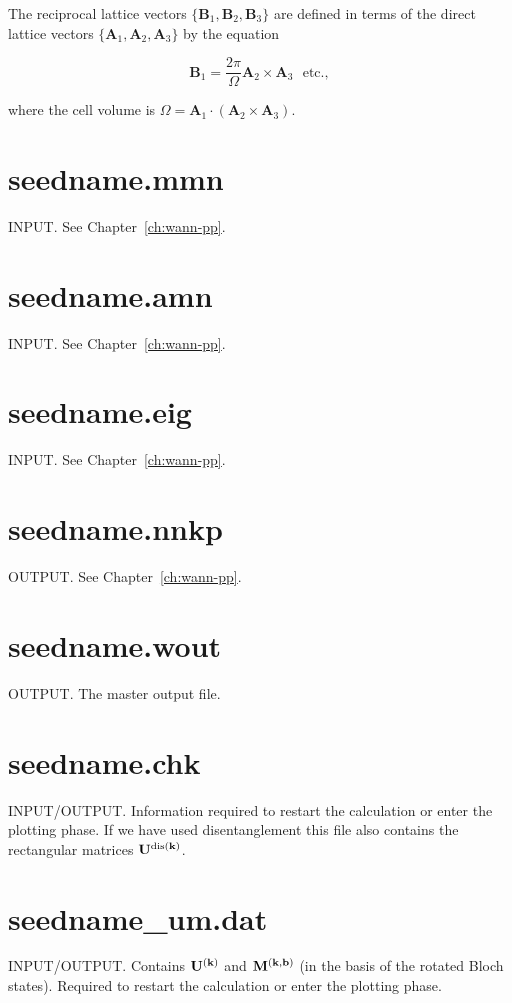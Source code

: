 The reciprocal lattice vectors
$\{\mathbf{B}_{1},\mathbf{B}_{2},\mathbf{B}_{3}\}$ are defined in
terms
of the direct lattice vectors
$\{\mathbf{A}_{1},\mathbf{A}_{2},\mathbf{A}_{3}\}$ by the equation

\begin{equation}
\mathbf{B}_{1} = \frac{2\pi}{\Omega}\mathbf{A}_{2}\times\mathbf{A}_{3}
\ \ \ \mathrm{etc.},
\end{equation}

where the cell volume is
$\Omega=\mathbf{A}_{1}\cdot(\mathbf{A}_{2}\times\mathbf{A}_{3})$.

\section{seedname.mmn}
INPUT. See Chapter~\ref{ch:wann-pp}.

\section{seedname.amn}
INPUT. See Chapter~\ref{ch:wann-pp}.

\section{seedname.eig}
INPUT. See Chapter~\ref{ch:wann-pp}.

\section{seedname.nnkp} \label{sec:old-nnkp}
OUTPUT. See Chapter~\ref{ch:wann-pp}.

\section{seedname.wout}
OUTPUT. The master output file.

\section{seedname.chk}
INPUT/OUTPUT. Information required to restart the calculation or enter the
plotting phase. If we have used disentanglement this file also contains the
rectangular matrices $\bf{U}^{{\rm dis}({\bf k})}$.

\section{seedname\_um.dat}
INPUT/OUTPUT. Contains $\bf{U}^{({\bf k})}$ and $\bf{M}^{(\bf{k,b})}$ (in the
basis of the rotated Bloch states). Required to restart the calculation or enter the
plotting phase.

